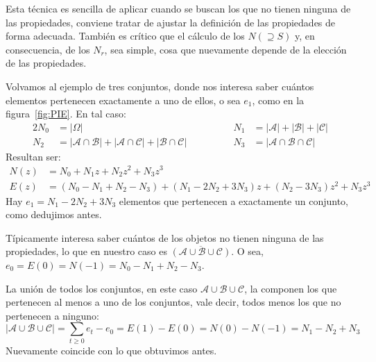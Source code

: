   Esta técnica es sencilla de aplicar
  cuando se buscan los que no tienen ninguna de las propiedades,
  conviene tratar de ajustar
  la definición de las propiedades de forma adecuada.
  También es crítico que el cálculo de los \(N(\supseteq S)\)
  y,
  en consecuencia,
  de los \(N_r\),
  sea simple,
  cosa que nuevamente depende de la elección de las propiedades.

  Volvamos al ejemplo de tres conjuntos,
  donde nos interesa saber cuántos elementos
  pertenecen exactamente a uno de ellos,
  o sea \(e_1\),
  como en la figura~\ref{fig:PIE}.
  En tal caso:
  \begin{alignat*}{2}
    N_0
      &= \lvert \Omega \rvert
    &
    N_1
      &= \lvert \mathcal{A} \rvert
	   + \lvert \mathcal{B} \rvert
	   + \lvert \mathcal{C} \rvert \\
    N_2
      &= \lvert \mathcal{A} \cap \mathcal{B} \rvert
	   + \lvert \mathcal{A} \cap \mathcal{C} \rvert
	   + \lvert \mathcal{B} \cap \mathcal{C} \rvert
    \hspace{4em}&
    N_3
      &= \lvert \mathcal{A} \cap \mathcal{B} \cap \mathcal{C} \rvert
  \end{alignat*}
  Resultan ser:
  \begin{align*}
    N(z)
      &= N_0 + N_1 z + N_2 z^2 + N_3 z^3 \\
    E(z)
      &= (N_0 - N_1 + N_2 - N_3)
	   + (N_1 - 2 N_2 + 3 N_3) z
	   + (N_2 - 3 N_3) z^2
	   + N_3 z^3
  \end{align*}
  Hay \(e_1 = N_1 - 2 N_2 + 3 N_3\) elementos
  que pertenecen a exactamente un conjunto,
  como dedujimos antes.

  Típicamente interesa saber cuántos de los objetos
  no tienen ninguna de las propiedades,
  lo que en nuestro caso es
  \(\overline{(\mathcal{A} \cup \mathcal{B} \cup \mathcal{C})}\).
  O sea,
  \(e_0 = E(0) = N(-1) = N_0 - N_1 + N_2 - N_3\).

  La unión de todos los conjuntos,
  en este caso \(\mathcal{A} \cup \mathcal{B} \cup \mathcal{C}\),
  la componen los que pertenecen al menos a uno de los conjuntos,
  vale decir,
  todos menos los que no pertenecen a ninguno:
  \begin{equation*}
    \lvert \mathcal{A} \cup \mathcal{B} \cup \mathcal{C} \rvert
      = \sum_{t \ge 0} e_t - e_0
      = E(1) - E(0)
      = N(0) - N(-1)
      = N_1 - N_2 + N_3
  \end{equation*}
  Nuevamente coincide con lo que obtuvimos antes.

